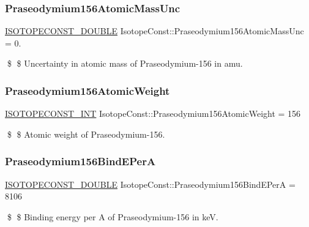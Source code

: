 \subsubsection{\texorpdfstring{Praseodymium156\+Atomic\+Mass\+Unc}{Praseodymium156AtomicMassUnc}}
{\footnotesize\ttfamily \mbox{\hyperlink{group___isotope_const-_macros_ga8f45a7272ce02c0b4c65c44636ed719a}{I\+S\+O\+T\+O\+P\+E\+C\+O\+N\+S\+T\+\_\+\+D\+O\+U\+B\+LE}} Isotope\+Const\+::\+Praseodymium156\+Atomic\+Mass\+Unc = 0.}

\$ \$ Uncertainty in atomic mass of Praseodymium-\/156 in amu. \mbox{\label{group___isotope_const-_praseodymium-_pr156_gacf417a08aa96737aa9258921e8fef157}} 
\subsubsection{\texorpdfstring{Praseodymium156\+Atomic\+Weight}{Praseodymium156AtomicWeight}}
{\footnotesize\ttfamily \mbox{\hyperlink{group___isotope_const-_macros_ga5f18360b3e99483a35c32d789e62621c}{I\+S\+O\+T\+O\+P\+E\+C\+O\+N\+S\+T\+\_\+\+I\+NT}} Isotope\+Const\+::\+Praseodymium156\+Atomic\+Weight = 156}

\$ \$ Atomic weight of Praseodymium-\/156. \mbox{\label{group___isotope_const-_praseodymium-_pr156_gacbd6b9a54364245e803279f721dcc197}} 
\subsubsection{\texorpdfstring{Praseodymium156\+Bind\+E\+PerA}{Praseodymium156BindEPerA}}
{\footnotesize\ttfamily \mbox{\hyperlink{group___isotope_const-_macros_ga8f45a7272ce02c0b4c65c44636ed719a}{I\+S\+O\+T\+O\+P\+E\+C\+O\+N\+S\+T\+\_\+\+D\+O\+U\+B\+LE}} Isotope\+Const\+::\+Praseodymium156\+Bind\+E\+PerA = 8106}

\$ \$ Binding energy per A of Praseodymium-\/156 in keV. \mbox{\label{group___isotope_const-_praseodymium-_pr156_gaf08519a1776ca330346b095e8f74e04a}} 
